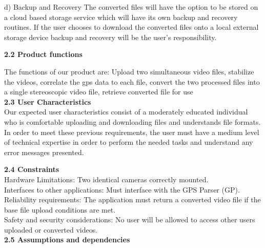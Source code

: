 \documentclass[10pt,draftclsnofoot,onecolumn]{IEEEtran}
\begin{document}
d) Backup and Recovery 
	The converted files will have the option to be stored on a cloud based storage service which will have its own backup and recovery routines. If the user chooses to download the converted files onto a local external storage device backup and recovery will be the user’s responsibility.
	
	
	\vspace{5mm}
	
	{\Medium\textbf{2.2 Product functions}} \\
	\vspace{5mm}

	The functions of our product are: Upload two simultaneous video files, stabilize the videos, correlate the gps data to each file, convert the two processed files into a single stereoscopic video file, retrieve converted file for use \\
		\vspace{5mm}
	{\Medium\textbf{2.3 User Characteristics}} \\
		\vspace{5mm}
Our expected user characteristics consist of a moderately educated individual who is comfortable uploading and downloading files and understands file formats. In order to meet these previous requirements, the user must have a medium level of technical expertise in order to perform the needed tasks and understand any error messages presented. \\
	 
			\vspace{5mm}

		{\Medium\textbf{2.4 Constraints}} \\
			\vspace{5mm}
Hardware Limitations: Two identical cameras correctly mounted.\\
			\vspace{2mm}
Interfaces to other applications: Must interface with the GPS Parser (GP).\\
	\vspace{2mm}
Reliability requirements: The application must return a converted video file if the base file upload conditions are met.\\
	\vspace{2mm}
Safety and security considerations: No user will be allowed to access other users uploaded or converted videos.\\
			\vspace{5mm}
		{\Medium\textbf{2.5 Assumptions and dependencies}} \\
					\vspace{5mm}
\end{document}

